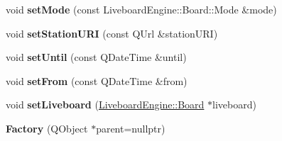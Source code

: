 \begin{DoxyCompactItemize}
\mbox{\label{classLiveboardEngine_1_1Factory_a7d34790a70c3648bb131a50a6d3e6d89}} 
void {\bfseries set\+Mode} (const Liveboard\+Engine\+::\+Board\+::\+Mode \&mode)
\item 
\mbox{\label{classLiveboardEngine_1_1Factory_a0f1b6032456353dde732bf7e57801aa8}} 
void {\bfseries set\+Station\+U\+RI} (const Q\+Url \&station\+U\+RI)
\item 
\mbox{\label{classLiveboardEngine_1_1Factory_adfb070f58b28a55be0f44a81acc44863}} 
void {\bfseries set\+Until} (const Q\+Date\+Time \&until)
\item 
\mbox{\label{classLiveboardEngine_1_1Factory_a1cb666c3dd962fd95d7a82faa3c7977b}} 
void {\bfseries set\+From} (const Q\+Date\+Time \&from)
\item 
\mbox{\label{classLiveboardEngine_1_1Factory_a2b320b1d62e58d4640adfc28ff3bb1b2}} 
void {\bfseries set\+Liveboard} (\mbox{\hyperlink{classLiveboardEngine_1_1Board}{Liveboard\+Engine\+::\+Board}} $\ast$liveboard)
\item 
\mbox{\label{classLiveboardEngine_1_1Factory_a48031c644406c9f4c5216afccbcd31ae}} 
{\bfseries Factory} (Q\+Object $\ast$parent=nullptr)
\end{DoxyCompactItemize}

